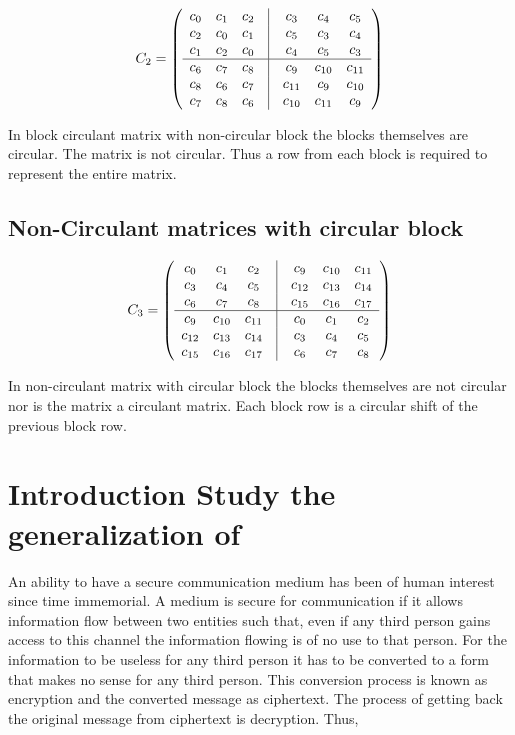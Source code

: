 \[ C_{2} =\left( \begin{array}{ccccccc}
c_{0} & c_{1} &c_{2} & \vline & c_{3} & c_{4} &c_{5} \\
c_{2} & c_{0} &c_{1} & \vline & c_{5} & c_{3} &c_{4} \\
c_{1} & c_{2} &c_{0} & \vline & c_{4} & c_{5} &c_{3} \\
\hline
c_{6} & c_{7} &c_{8} & \vline & c_{9} & c_{10} &c_{11} \\
c_{8} & c_{6} &c_{7} & \vline & c_{11} & c_{9} &c_{10} \\
c_{7} & c_{8} &c_{6} & \vline & c_{10} & c_{11} &c_{9} \\
\end{array} \right)\]

In block circulant matrix with non-circular block the blocks  themselves are circular. The matrix is not circular. Thus  a row from
each block is required to represent the entire matrix.

\subsection{Non-Circulant matrices with circular block}
\[ C_{3} =\left( \begin{array}{ccccccc}
c_{0} & c_{1} &c_{2} & \vline & c_{9} & c_{10} &c_{11}   \\
c_{3} & c_{4} &c_{5} & \vline & c_{12} & c_{13} &c_{14}   \\
c_{6} & c_{7} &c_{8} & \vline & c_{15} & c_{16} &c_{17}   \\
\hline
c_{9} & c_{10} &c_{11} & \vline & c_{0} & c_{1} &c_{2}   \\
c_{12} & c_{13} &c_{14} & \vline & c_{3} & c_{4} &c_{5}  \\
c_{15} & c_{16} &c_{17} & \vline & c_{6} & c_{7} &c_{8}   \\
\end{array} \right)\]

In non-circulant matrix with circular block the blocks themselves are not circular nor is the matrix a circulant matrix. 
Each block row is a circular shift of the previous block row.


\section{Introduction Study the generalization of }

An ability to have a secure communication medium has been of human interest since time immemorial.
A medium is secure for communication if it allows information flow between two entities such that, even if any third person 
gains access to this channel the information flowing is of no use to that person.
For the information to be useless for any third person it has to be converted to a form that makes no sense for any third person.
This conversion process is known as encryption and the converted message as ciphertext. 
The process of getting back the original message from ciphertext is decryption.
Thus,

